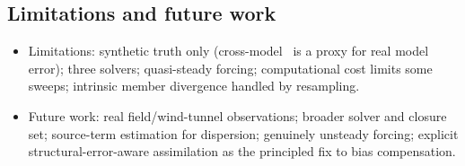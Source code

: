 \subsection{Limitations and future work}
\label{sec:discussion:limitations}
\begin{itemize}
  \item Limitations: synthetic truth only (cross-model \discrepancy\ is a
        proxy for real model error); three solvers; quasi-steady forcing;
        computational cost limits some sweeps; intrinsic member divergence
        handled by resampling.
  \item Future work: real field/wind-tunnel observations; broader solver and
        closure set; source-term estimation for dispersion; genuinely unsteady
        forcing; explicit structural-error-aware assimilation as the
        principled fix to bias compensation.
\end{itemize}
